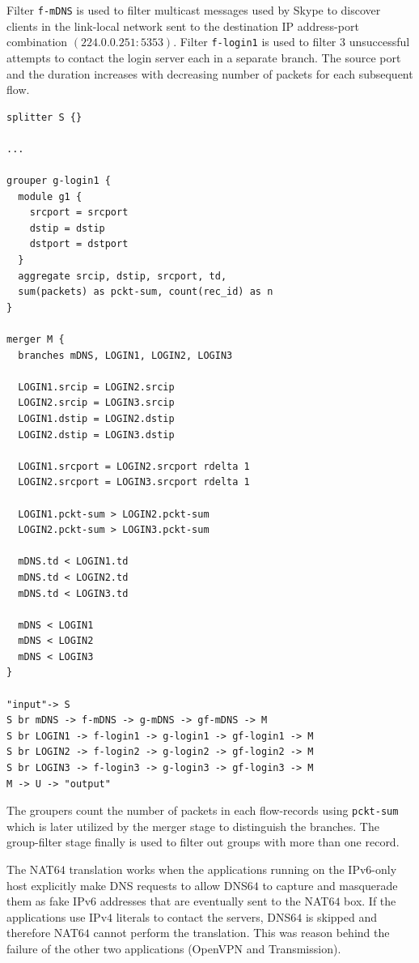 Filter \texttt{f-mDNS} is used to filter multicast messages used by Skype to discover clients in the link-local network sent to the destination IP address-port combination $(224.0.0.251:5353)$. Filter \texttt{f-login1} is used to filter $3$ unsuccessful attempts to contact the login server each in a separate branch. The  source port and the duration increases with decreasing number of packets for each subsequent flow.
\begin{lstlisting}
splitter S {}

...

grouper g-login1 {
  module g1 {
    srcport = srcport
    dstip = dstip
    dstport = dstport
  }
  aggregate srcip, dstip, srcport, td,
  sum(packets) as pckt-sum, count(rec_id) as n
}

merger M {
  branches mDNS, LOGIN1, LOGIN2, LOGIN3

  LOGIN1.srcip = LOGIN2.srcip
  LOGIN2.srcip = LOGIN3.srcip
  LOGIN1.dstip = LOGIN2.dstip
  LOGIN2.dstip = LOGIN3.dstip

  LOGIN1.srcport = LOGIN2.srcport rdelta 1
  LOGIN2.srcport = LOGIN3.srcport rdelta 1

  LOGIN1.pckt-sum > LOGIN2.pckt-sum
  LOGIN2.pckt-sum > LOGIN3.pckt-sum

  mDNS.td < LOGIN1.td
  mDNS.td < LOGIN2.td
  mDNS.td < LOGIN3.td

  mDNS < LOGIN1
  mDNS < LOGIN2
  mDNS < LOGIN3
}

"input"-> S
S br mDNS -> f-mDNS -> g-mDNS -> gf-mDNS -> M
S br LOGIN1 -> f-login1 -> g-login1 -> gf-login1 -> M
S br LOGIN2 -> f-login2 -> g-login2 -> gf-login2 -> M
S br LOGIN3 -> f-login3 -> g-login3 -> gf-login3 -> M
M -> U -> "output"

\end{lstlisting}
The groupers count the number of packets in each flow-records using \texttt{pckt-sum} which is later utilized by the merger stage to distinguish the branches. The group-filter stage finally is used to filter out groups with more than one record.

The NAT$64$ translation works when the applications running on the IPv$6$-only host explicitly make DNS requests to allow DNS$64$ to capture and masquerade them as fake IPv$6$ addresses that are eventually sent to the NAT$64$ box. If the applications use IPv$4$ literals to contact the servers, DNS$64$ is skipped and therefore NAT$64$ cannot perform the translation. This was reason behind the failure of the other two applications (OpenVPN and Transmission).

